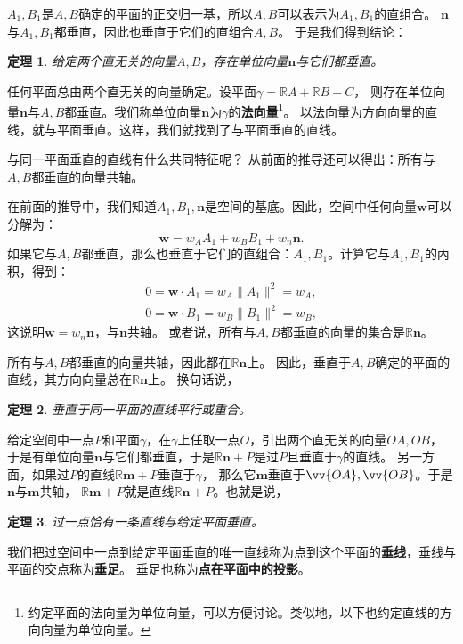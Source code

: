 \documentclass[12pt,UTF8]{ctexbook}
\newtheorem{tm}{定理}[section]
\begin{document}
$A_1,B_1$是$A,B$确定的平面的正交归一基，所以$A,B$可以表示为$A_1,B_1$的直组合。
$\mathbf{n}$与$A_1,B_1$都垂直，因此也垂直于它们的直组合$A,B$。
于是我们得到结论：
\begin{tm}\label{tm:1-3-30}
    给定两个直无关的向量$A,B$，存在单位向量$\mathbf{n}$与它们都垂直。
\end{tm}
任何平面总由两个直无关的向量确定。设平面$\gamma = \mathbb{R}A + \mathbb{R}B + C$，
则存在单位向量$\mathbf{n}$与$A,B$都垂直。我们称单位向量$\mathbf{n}$为$\gamma$的\textbf{法向量}\footnote{约定平面的法向量为单位向量，可以方便讨论。类似地，以下也约定直线的方向向量为单位向量。}。
以法向量为方向向量的直线，就与平面垂直。这样，我们就找到了与平面垂直的直线。

与同一平面垂直的直线有什么共同特征呢？
从前面的推导还可以得出：所有与$A,B$都垂直的向量共轴。

在前面的推导中，我们知道$A_1,B_1,\mathbf{n}$是空间的基底。因此，空间中任何向量$\mathbf{w}$可以分解为：
$$ \mathbf{w} = w_A A_1 + w_B B_1 + w_n \mathbf{n}. $$
如果它与$A,B$都垂直，那么也垂直于它们的直组合：$A_1,B_1$。计算它与$A_1,B_1$的內积，得到：
\begin{align*}
    0 = \mathbf{w}\cdot A_1  = w_A\|A_1\|^2 = w_A,  \\
    0 = \mathbf{w}\cdot B_1  = w_B\|B_1\|^2 = w_B,  
\end{align*}
这说明$\mathbf{w} = w_n \mathbf{n}$，与$\mathbf{n}$共轴。
或者说，所有与$A,B$都垂直的向量的集合是$\mathbb{R}\mathbf{n}$。

所有与$A,B$都垂直的向量共轴，因此都在$\mathbb{R}\mathbf{n}$上。
因此，垂直于$A,B$确定的平面的直线，其方向向量总在$\mathbb{R}\mathbf{n}$上。
换句话说，
\begin{tm}\label{tm:1-3-40}
    垂直于同一平面的直线平行或重合。
\end{tm}
给定空间中一点$P$和平面$\gamma$，在$\gamma$上任取一点$O$，引出两个直无关的向量$OA,OB$，
于是有单位向量$\mathbf{n}$与它们都垂直，于是$\mathbb{R}\mathbf{n} + P$是过$P$且垂直于$\gamma$的直线。
另一方面，如果过$P$的直线$\mathbb{R}\mathbf{m} + P$垂直于$\gamma$，
那么它$\mathbf{m}$垂直于$\vv{OA},\vv{OB}$。于是$\mathbf{n}$与$\mathbf{m}$共轴，
$\mathbb{R}\mathbf{m} + P$就是直线$\mathbb{R}\mathbf{n} + P$。也就是说，
\begin{tm}\label{tm:1-3-50}
    过一点恰有一条直线与给定平面垂直。
\end{tm}
我们把过空间中一点到给定平面垂直的唯一直线称为点到这个平面的\textbf{垂线}，垂线与平面的交点称为\textbf{垂足}。
垂足也称为\textbf{点在平面中的投影}。
\end{document}
